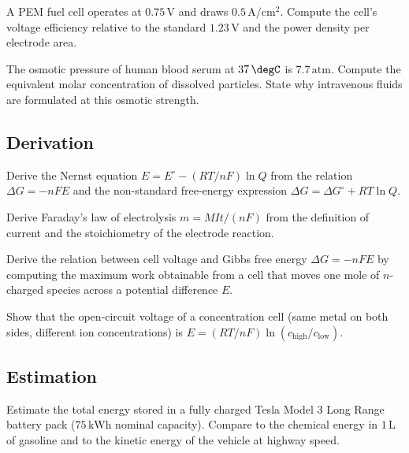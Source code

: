 \begin{exercise}
A PEM fuel cell operates at $0.75\,\text{V}$ and draws $0.5\,\text{A}/
\text{cm}^2$. Compute the cell's voltage efficiency relative to the
standard $1.23\,\text{V}$ and the power density per electrode area.
\end{exercise}

\begin{exercise}
The osmotic pressure of human blood serum at $37\,\degC$ is $7.7\,
\text{atm}$. Compute the equivalent molar concentration of dissolved
particles. State why intravenous fluids are formulated at this
osmotic strength.
\end{exercise}

\subsection*{Derivation}

\begin{exercise}
Derive the Nernst equation $E = E^\circ - (RT/nF) \ln Q$ from the
relation $\Delta G = -nFE$ and the non-standard free-energy expression
$\Delta G = \Delta G^\circ + RT \ln Q$.
\end{exercise}

\begin{exercise}
Derive Faraday's law of electrolysis $m = MIt/(nF)$ from the definition
of current and the stoichiometry of the electrode reaction.
\end{exercise}

\begin{exercise}
Derive the relation between cell voltage and Gibbs free energy
$\Delta G = -nFE$ by computing the maximum work obtainable from a
cell that moves one mole of $n$-charged species across a potential
difference $E$.
\end{exercise}

\begin{exercise}
Show that the open-circuit voltage of a concentration cell (same
metal on both sides, different ion concentrations) is $E = (RT/nF)
\ln(c_{\text{high}}/c_{\text{low}})$.
\end{exercise}

\subsection*{Estimation}

\begin{exercise}
Estimate the total energy stored in a fully charged Tesla Model 3
Long Range battery pack ($75\,\text{kWh}$ nominal capacity).
Compare to the chemical energy in $1\,\text{L}$ of gasoline and to
the kinetic energy of the vehicle at highway speed.
\end{exercise}

